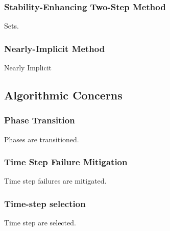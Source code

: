 \documentclass[compress,xcolor=table]{beamer}
\begin{document}
\begin{frame}
\frametitle{Stability-Enhancing Two-Step Method}

Sets.

\end{frame}
\begin{frame}
\frametitle{Nearly-Implicit Method}

Nearly Implicit

\end{frame}
\subsection[Algorithmic Concerns]{Algorithmic Concerns}
\begin{frame}
\frametitle{Phase Transition}

Phases are transitioned.

\end{frame}
\begin{frame}
\frametitle{Time Step Failure Mitigation}

Time step failures are mitigated.

\end{frame}
\begin{frame}
\frametitle{Time-step selection}

Time step are selected.

\end{frame}
\end{document}

